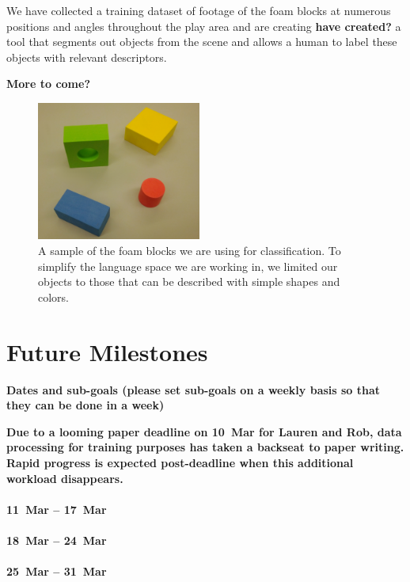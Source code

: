\documentclass[11pt]{article}
\newcommand{\xxx}[1]{{\bf \color{red} #1}}
\newcommand{\meh}[1]{{\bf \color{blue} #1}}
\begin{document}
We have collected a training dataset of footage of the foam blocks at numerous
positions and angles throughout the play area and are creating \xxx{have
created?} a tool that segments out objects from the scene and allows a human
to label these objects with relevant descriptors.

\xxx{More to come?}

\begin{figure}
\centering
\includegraphics[width=0.48\textwidth]{figures/blocks.png}
\caption{A sample of the foam blocks we are using for classification. To
    simplify the language space we are working in, we limited our objects to
    those that can be described with simple shapes and colors.}
\label{fig:blocks}
\end{figure}

\section{Future Milestones}
\xxx{Dates and sub-goals (please set sub-goals on a weekly basis so that they
    can be done in a week)}

\meh{Due to a looming paper deadline on 10~Mar for Lauren and Rob, data
    processing for training purposes has taken a backseat to paper writing.
    Rapid progress is expected post-deadline when this additional workload
    disappears.}

\paragraph{11~Mar -- 17~Mar}

\paragraph{18~Mar -- 24~Mar}

\paragraph{25~Mar -- 31~Mar}
\end{document}
